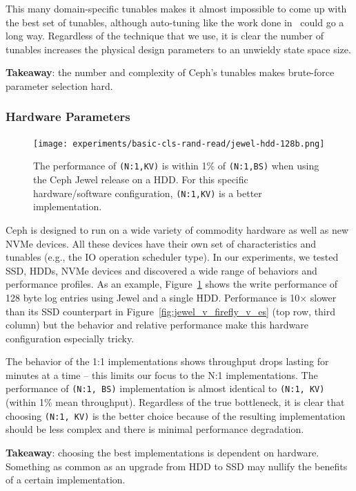 \documentclass[10pt,twocolumn]{article}
\begin{document}
This many domain-specific tunables makes it almost impossible to come up with
the best set of tunables, although auto-tuning like the work done
in~\cite{behzad:sc2013-autotuning} could go a long way. Regardless of the
technique that we use, it is clear the number of tunables increases the
physical design parameters to an unwieldy state space size.

\textbf{Takeaway}: the number and complexity of Ceph's tunables makes
brute-force parameter selection hard.

\subsubsection{Hardware Parameters}

\begin{figure}[t]
	\centering
	\texttt{[image: experiments/basic-cls-rand-read/jewel-hdd-128b.png]}
	\caption{The performance of \texttt{(N:1,KV)} is within 1\% of \texttt{(N:1,BS)} when using the Ceph Jewel release on a HDD. For this specific hardware/software configuration, \texttt{(N:1,KV)} is a better implementation.}
	\label{fig:jewel-hdd-128b}
\end{figure}

Ceph is designed to run on a wide variety of commodity hardware as well as new
NVMe devices. All these devices have their own set of characteristics and
tunables (e.g., the IO operation scheduler type). In our experiments, we tested
SSD, HDDs, NVMe devices and discovered a wide range of behaviors and
performance profiles. As an example, Figure~\ref{fig:jewel-hdd-128b} shows the
write performance of 128 byte log entries using Jewel and a single HDD.
Performance is 10\(\times\) slower than its SSD counterpart in
Figure~\ref{fig:jewel_v_firefly_v_es} (top row, third column) but the behavior
and relative performance make this hardware configuration especially tricky.

The behavior of the 1:1 implementations shows throughput drops lasting for
minutes at a time -- this limits our focus to the N:1 implementations. The
performance of \texttt{(N:1, BS)} implementation is almost identical to
\texttt{(N:1, KV)} (within 1\% mean throughput). Regardless of the true
bottleneck, it is clear that choosing \texttt{(N:1, KV)} is the better choice
because of the resulting implementation should be less complex and there is
minimal performance degradation.

\textbf{Takeaway}: choosing the best implementations is dependent on hardware.
Something as common as an upgrade from HDD to SSD may nullify the benefits of a
certain implementation. 
\end{document}
